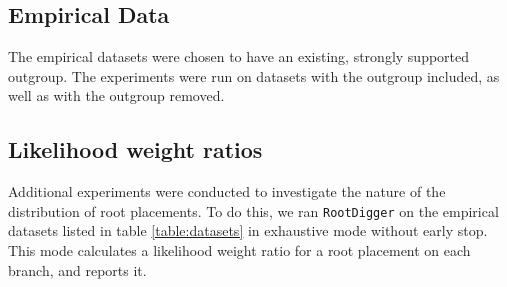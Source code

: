 \documentclass{article}
\newcommand{\RootDiggertt}{\texttt{RootDigger}}
\begin{document}
\begin{table}
  \begin{center}
    
    \label{table:results}
  \end{center}
\end{table}

\begin{table}
  \begin{center}
    
    \label{table:time_results}
  \end{center}
\end{table}


\subsection{Empirical Data}

The empirical datasets were chosen to have an existing, strongly supported
outgroup. The experiments were run on datasets with the outgroup included, as
well as with the outgroup removed.

\begin{table}[H]
  \begin{center}
    
    \label{table:datasets}
  \end{center}
\end{table}

\begin{table}
  \begin{center}
    
    \label{table:emperical_results}
  \end{center}
\end{table}

\subsection{Likelihood weight ratios}

Additional experiments were conducted to investigate the nature of the
distribution of root placements. To do this, we ran \RootDiggertt{} on the empirical
datasets listed in table \ref{table:datasets} in exhaustive mode without early
stop. This mode calculates a likelihood weight ratio for a root placement on
each branch, and reports it.
\end{document}

